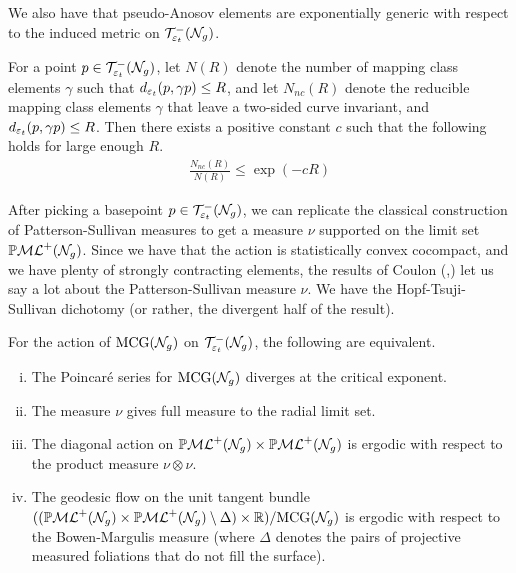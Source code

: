 We also have that pseudo-Anosov elements are exponentially generic with respect to the induced metric on $\mathcal{T}_{\varepsilon_t}^{-}(\mathcal{N}_g)$.

\begin{theorem}
  \label{thm:pure-exponential}
  For a point $p \in \mathcal{T}_{\varepsilon_t}^{-}(\mathcal{N}_g)$, let $N(R)$ denote the number of mapping class elements $\gamma$ such that $d_{\varepsilon_t}(p, \gamma p) \leq R$, and let $N_{nc}(R)$ denote the reducible mapping class elements $\gamma$ that leave a two-sided curve invariant, and $d_{\varepsilon_t}(p, \gamma p) \leq R$.
  Then there exists a positive constant $c$ such that the following holds for large enough $R$.
  \begin{align*}
    \frac{N_{nc}(R)}{N(R)} \leq \exp(-cR)
  \end{align*}
\end{theorem}

After picking a basepoint $p \in \mathcal{T}_{\varepsilon_t}^{-}(\mathcal{N}_g)$, we can replicate the classical construction of Patterson-Sullivan measures \cite{sullivan1979density} to get a measure $\nu$ supported on the limit set $\mathbb{P}\mathcal{ML}^+(\mathcal{N}_g)$.
Since we have that the action is statistically convex cocompact, and we have plenty of strongly contracting elements, the results of Coulon (\cite{coulon2022patterson},\cite{coulon2024ergodicity}) let us say a lot about the Patterson-Sullivan measure $\nu$.
We have the Hopf-Tsuji-Sullivan dichotomy (or rather, the divergent half of the result).

\begin{theorem}
  \label{thm:hts-dichotomy}
  For the action of $\mathrm{MCG}(\mathcal{N}_g)$ on $\mathcal{T}_{\varepsilon_t}^{-}(\mathcal{N}_g)$, the following are equivalent.
  \begin{enumerate}[(i)]
  \item The Poincaré series for $\mathrm{MCG}(\mathcal{N}_g)$ diverges at the critical exponent.
  \item The measure $\nu$ gives full measure to the radial limit set.
  \item The diagonal action on $\mathbb{P}\mathcal{ML}^+(\mathcal{N}_g) \times \mathbb{P}\mathcal{ML}^+(\mathcal{N}_g)$ is ergodic with respect to the product measure $\nu \otimes \nu$.
  \item The geodesic flow on the unit tangent bundle $((\mathbb{P}\mathcal{ML}^+(\mathcal{N}_g) \times \mathbb{P}\mathcal{ML}^+(\mathcal{N}_g) \setminus \Delta) \times \mathbb{R})/\mathrm{MCG}(\mathcal{N}_g)$ is ergodic with respect to the Bowen-Margulis measure (where $\Delta$ denotes the pairs of projective measured foliations that do not fill the surface).
  \end{enumerate}
\end{theorem}

